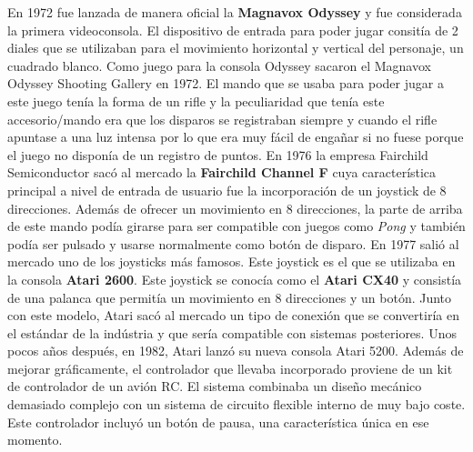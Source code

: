 En 1972 fue lanzada de manera oficial la \textbf{Magnavox Odyssey} y fue considerada la primera videoconsola. El dispositivo de entrada para poder jugar consit\'ia de 2 diales que se utilizaban para el movimiento horizontal y vertical del personaje, un cuadrado blanco. Como juego para la consola Odyssey sacaron el Magnavox Odyssey Shooting Gallery en 1972. El mando que se usaba para poder jugar a este juego tenía la forma de un rifle y la peculiaridad que tenía este accesorio/mando era que los disparos se registraban siempre y cuando el rifle apuntase a una luz intensa por lo que era muy f\'acil de enga\~nar si no fuese porque el juego no dispon\'ia de un registro de puntos. En 1976 la empresa Fairchild Semiconductor sac\'o al mercado la \textbf{Fairchild Channel F} cuya caracter\'istica principal a nivel de entrada de usuario fue la incorporaci\'on de un joystick de 8 direcciones.  Adem\'as de ofrecer un movimiento en 8 direcciones, la parte de arriba de este mando pod\'ia girarse para ser compatible con juegos como \textit{Pong} y tambi\'en pod\'ia ser pulsado y usarse normalmente como bot\'on de disparo. En 1977 sali\'o al mercado uno de los joysticks m\'as famosos. Este joystick es el que se utilizaba en la consola \textbf{Atari 2600}. Este joystick se conoc\'ia como el \textbf{Atari CX40} y consist\'ia de una palanca que permit\'ia un movimiento en 8 direcciones y un bot\'on. Junto con este modelo, Atari sac\'o al mercado un tipo de conexi\'on que se convertir\'ia en el est\'andar de la ind\'ustria y que ser\'ia compatible con sistemas posteriores. Unos pocos a\~nos despu\'es, en 1982, Atari lanz\'o su nueva consola Atari 5200. Adem\'as de mejorar gr\'aficamente, el controlador que llevaba incorporado proviene de un kit de controlador de un avi\'on RC. El sistema combinaba un dise\~no mec\'anico demasiado complejo con un sistema de circuito flexible interno de muy bajo coste. Este controlador incluy\'o un bot\'on de pausa, una caracter\'istica \'unica en ese momento.\\

